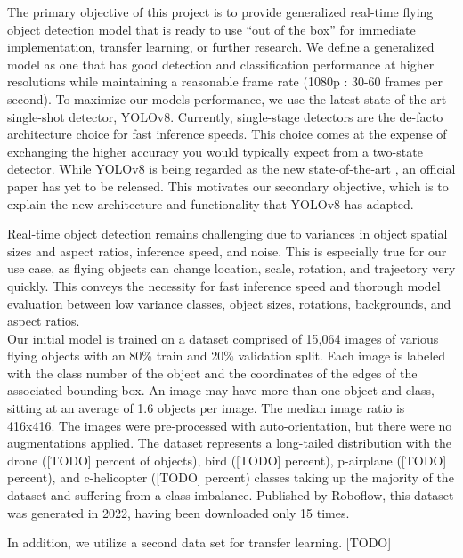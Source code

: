 \documentclass[10pt,twocolumn,letterpaper]{article}
\begin{document}
The primary objective of this project is to provide generalized real-time flying object detection model that is ready to use ``out of the box'' for immediate implementation, transfer learning, or further research. We define a generalized model as one that has good detection and classification performance at higher resolutions while maintaining a reasonable frame rate (1080p : 30-60 frames per second). To maximize our models performance, we use the latest state-of-the-art single-shot detector, YOLOv8. Currently, single-stage detectors are the de-facto architecture choice for fast inference speeds. This choice comes at the expense of exchanging the higher accuracy you would typically expect from a two-state detector. While YOLOv8 is being regarded as the new state-of-the-art \cite{state-of-the-art}, an official paper has yet to be released. This motivates our secondary objective, which is to explain the new architecture and functionality that YOLOv8 has adapted. 

Real-time object detection remains challenging due to variances in object spatial sizes and aspect ratios, inference speed, and noise. This is especially true for our use case, as flying objects can change location, scale, rotation, and trajectory very quickly. This conveys the necessity for fast inference speed and thorough model evaluation between low variance classes, object sizes, rotations, backgrounds, and aspect ratios.
\\
Our initial model is trained on a dataset \cite{InitialDataset} comprised of 15,064 images of various flying objects with an 80\% train and 20\% validation split. Each image is labeled with the class number of the object and the coordinates of the edges of the associated bounding box. An image may have more than one object and class, sitting at an average of 1.6 objects per image. The median image ratio is 416x416. The images were pre-processed with auto-orientation, but there were no augmentations applied. The dataset represents a long-tailed distribution with the drone ([TODO] percent of objects), bird ([TODO] percent), p-airplane ([TODO] percent), and c-helicopter ([TODO] percent) classes taking up the majority of the dataset and suffering from a class imbalance. Published by Roboflow, this dataset was generated in 2022, having been downloaded only 15 times.

In addition, we utilize a second data set \cite{TransferDataset} for transfer learning. [TODO]
\end{document}
